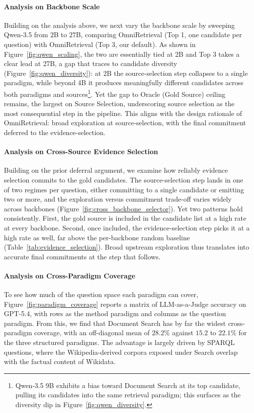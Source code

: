 \paragraph{Analysis on Backbone Scale}
Building on the analysis above, we next vary the backbone scale by sweeping Qwen-3.5 from $2$B to $27$B, comparing OmniRetrieval (Top 1, one candidate per question) with OmniRetrieval (Top 3, our default). As shown in Figure~\ref{fig:qwen_scaling}, the two are essentially tied at 2B and Top 3 takes a clear lead at 27B, a gap that traces to candidate diversity (Figure~\ref{fig:qwen_diversity}): at 2B the source-selection step collapses to a single paradigm, while beyond 4B it produces meaningfully different candidates across both paradigms and sources\footnote{Qwen-3.5 9B exhibits a bias toward Document Search at its top candidate, pulling its candidates into the same retrieval paradigm; this surfaces as the diversity dip in Figure~\ref{fig:qwen_diversity}.}. Yet the gap to Oracle (Gold Source) ceiling remains, the largest on Source Selection, underscoring source selection as the most consequential step in the pipeline. This aligns with the design rationale of OmniRetrieval: broad exploration at source-selection, with the final commitment deferred to the evidence-selection.



\paragraph{Analysis on Cross-Source Evidence Selection}
Building on the prior deferral argument, we examine how reliably evidence selection commits to the gold candidates. The source-selection step lands in one of two regimes per question, either committing to a single candidate or emitting two or more, and the exploration versus commitment trade-off varies widely across backbones (Figure~\ref{fig:cross_backbone_selector}). Yet two patterns hold consistently. First, the gold source is included in the candidate list at a high rate at every backbone. Second, once included, the evidence-selection step picks it at a high rate as well, far above the per-backbone random baseline (Table~\ref{tab:evidence_selection}). Broad upstream exploration thus translates into accurate final commitments at the step that follows.

\paragraph{Analysis on Cross-Paradigm Coverage}
To see how much of the question space each paradigm can cover, Figure~\ref{fig:paradigm_coverage} reports a matrix of LLM-as-a-Judge accuracy on GPT-5.4, with rows as the method paradigm and columns as the question paradigm. From this, we find that Document Search has by far the widest cross-paradigm coverage, with an off-diagonal mean of $28.2\%$ against $15.2$ to $22.1\%$ for the three structured paradigms. The advantage is largely driven by SPARQL questions, where the Wikipedia-derived corpora exposed under Search overlap with the factual content of Wikidata.

